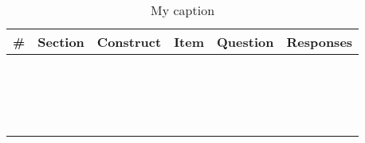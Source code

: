 

\begin{table}[]
	\centering
	\caption{My caption}
	\label{my-label}
	\begin{tabular}{@{}llllll@{}}
		\toprule
		{\bf \#} & {\bf Section} & {\bf Construct} & {\bf Item} & {\bf Question} & {\bf Responses} \\ \midrule
		&               &                 &            &                &                 \\
		&               &                 &            &                &                 \\
		&               &                 &            &                &                 \\
		&               &                 &            &                &                 \\
		&               &                 &            &                &                 \\
		&               &                 &            &                &                 \\
		&               &                 &            &                &                 \\
		&               &                 &            &                &                 \\
		&               &                 &            &                &                 \\
		&               &                 &            &                &                 \\
		&               &                 &            &                &                 \\
		&               &                 &            &                &                 \\
		&               &                 &            &                &                 \\
		&               &                 &            &                &                 \\
		&               &                 &            &                &                 \\
		&               &                 &            &                &                 \\
		&               &                 &            &                &                 \\ \bottomrule
	\end{tabular}
\end{table}
